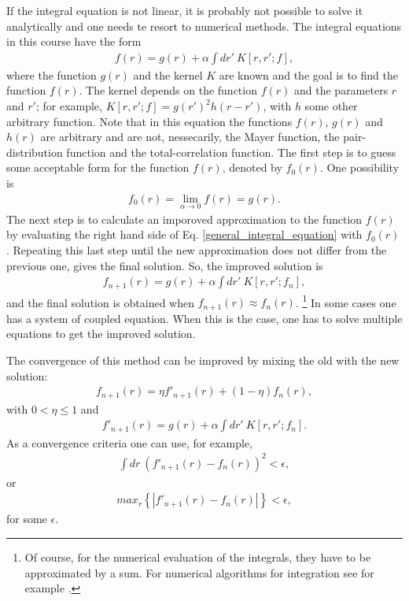 
If the integral equation is not linear, it is probably not
possible to solve it analytically and one needs te resort to 
numerical methods.
The integral equations in this course have the form
\begin{align}\label{general_integral_equation}
f(r) = g(r) + \alpha \int dr'~K[r,r';f],
\end{align}
where the function $g(r)$ and the kernel $K$ are known
and the goal is to find the function $f(r)$.
The kernel depends on the function $f(r)$ and the parameters $r$ and $r'$;
for example, $K[r,r';f] = g(r')^2 h(r-r')$, with $h$ some other arbitrary function.
Note that in this equation the functions $f(r)$, $g(r)$ and $h(r)$ are arbitrary and are not, nessecarily, the Mayer function,
the pair-distribution function and the total-correlation function.
The first step is to guess some acceptable form for the 
function $f(r)$, denoted by $f_0(r)$.
One possibility is
\begin{align}
f_0(r) = \lim_{\alpha \to 0} f(r) = g(r).
\end{align}
The next step is to calculate an imporoved approximation
to the function $f(r)$ by evaluating the right hand side of
Eq. \eqref{general_integral_equation} with $f_0(r)$.
Repeating this last step until the new approximation does not
differ from the previous one, gives the final solution.
So, the improved solution is
\begin{align}
f_{n+1}(r) = g(r) + \alpha \int dr'~K[r,r';f_n],
\end{align}
and the final solution is obtained when $f_{n+1}(r) \approx f_n(r)$.
\footnote{Of course, for the numerical evaluation of the integrals, they have to be approximated by a sum.
For numerical algorithms for integration see for example
\cite{press1992numerical}.}
In some cases one has a system of coupled equation.
When this is the case, one has to solve multiple equations
to get the improved solution.

The convergence of this method can be improved by mixing the old with the new solution:
\begin{align}
f_{n+1}(r) = \eta f'_{n+1}(r) + (1-\eta) f_n(r),
\end{align}
with $0 < \eta \leq 1$ and 
\begin{align}
f'_{n+1}(r) = g(r) + \alpha \int dr'~K[r,r';f_n].
\end{align}
As a convergence criteria one can use, for example,
\begin{align}
\int dr~\left( f'_{n+1}(r) - f_n(r) \right)^2 < \epsilon,
\end{align}
or
\begin{align}
max_r \left\{ | f'_{n+1}(r) - f_n(r) | \right\} < \epsilon,
\end{align}
for some $\epsilon$.


